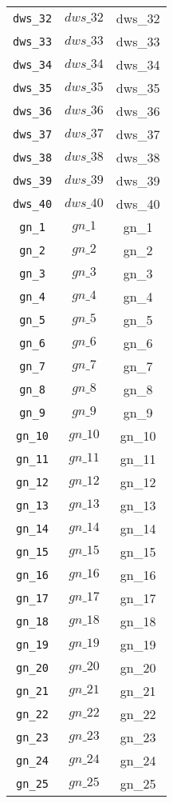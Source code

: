 \begin{center}
\begin{longtable}{ccc}
\texttt{dws\_32} & $dws\_32$ & dws\_32\\
\texttt{dws\_33} & $dws\_33$ & dws\_33\\
\texttt{dws\_34} & $dws\_34$ & dws\_34\\
\texttt{dws\_35} & $dws\_35$ & dws\_35\\
\texttt{dws\_36} & $dws\_36$ & dws\_36\\
\texttt{dws\_37} & $dws\_37$ & dws\_37\\
\texttt{dws\_38} & $dws\_38$ & dws\_38\\
\texttt{dws\_39} & $dws\_39$ & dws\_39\\
\texttt{dws\_40} & $dws\_40$ & dws\_40\\
\texttt{gn\_1} & $gn\_1$ & gn\_1\\
\texttt{gn\_2} & $gn\_2$ & gn\_2\\
\texttt{gn\_3} & $gn\_3$ & gn\_3\\
\texttt{gn\_4} & $gn\_4$ & gn\_4\\
\texttt{gn\_5} & $gn\_5$ & gn\_5\\
\texttt{gn\_6} & $gn\_6$ & gn\_6\\
\texttt{gn\_7} & $gn\_7$ & gn\_7\\
\texttt{gn\_8} & $gn\_8$ & gn\_8\\
\texttt{gn\_9} & $gn\_9$ & gn\_9\\
\texttt{gn\_10} & $gn\_10$ & gn\_10\\
\texttt{gn\_11} & $gn\_11$ & gn\_11\\
\texttt{gn\_12} & $gn\_12$ & gn\_12\\
\texttt{gn\_13} & $gn\_13$ & gn\_13\\
\texttt{gn\_14} & $gn\_14$ & gn\_14\\
\texttt{gn\_15} & $gn\_15$ & gn\_15\\
\texttt{gn\_16} & $gn\_16$ & gn\_16\\
\texttt{gn\_17} & $gn\_17$ & gn\_17\\
\texttt{gn\_18} & $gn\_18$ & gn\_18\\
\texttt{gn\_19} & $gn\_19$ & gn\_19\\
\texttt{gn\_20} & $gn\_20$ & gn\_20\\
\texttt{gn\_21} & $gn\_21$ & gn\_21\\
\texttt{gn\_22} & $gn\_22$ & gn\_22\\
\texttt{gn\_23} & $gn\_23$ & gn\_23\\
\texttt{gn\_24} & $gn\_24$ & gn\_24\\
\texttt{gn\_25} & $gn\_25$ & gn\_25\\

\end{longtable}
\end{center}
